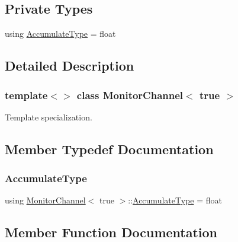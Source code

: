 \subsection*{Private Types}
\begin{DoxyCompactItemize}
\item 
using \hyperlink{classMonitorChannel_3_01true_01_4_af2569e58417243595e129831ac287351}{Accumulate\+Type} = float
\end{DoxyCompactItemize}


\subsection{Detailed Description}
\subsubsection*{template$<$$>$\newline
class Monitor\+Channel$<$ true $>$}

Template specialization. 

\subsection{Member Typedef Documentation}
\mbox{\label{classMonitorChannel_3_01true_01_4_af2569e58417243595e129831ac287351}} 
\subsubsection{\texorpdfstring{Accumulate\+Type}{AccumulateType}}
{\footnotesize\ttfamily using \hyperlink{classMonitorChannel}{Monitor\+Channel}$<$ true $>$\+::\hyperlink{classMonitorChannel_3_01true_01_4_af2569e58417243595e129831ac287351}{Accumulate\+Type} =  float\hspace{0.3cm}{\ttfamily [private]}}



\subsection{Member Function Documentation}
\mbox{\label{classMonitorChannel_3_01true_01_4_ade0e235d1f9f6f1624d898e8047b4026}} 
